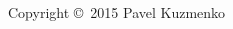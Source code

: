 \documentclass[10pt,landscape]{article}
\begin{document}
\begin{multicols}{2}
~\\
~\\
~\\
~\\
~\\
~\\
~\\
~\\
~\\

Copyright \copyright\ 2015 Pavel Kuzmenko


\end{multicols}
\end{document}

